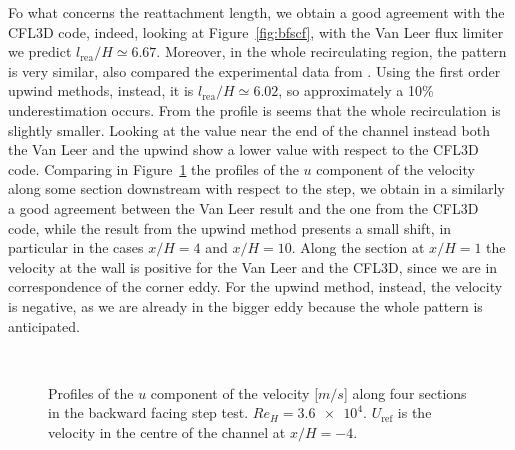 Fo what concerns the reattachment length, we obtain a good agreement with the CFL3D code, indeed, looking at Figure~\ref{fig:bfscf}, with the Van Leer flux limiter we predict $l_\text{rea} /H \simeq 6.67$. Moreover, in the whole recirculating region, the pattern is very similar, also compared the experimental data from \cite{bfs:driver}. Using the first order upwind methods, instead, it is $l_\text{rea} /H \simeq 6.02$, so approximately a 10\% underestimation occurs. From the profile is seems that the whole recirculation is slightly smaller. Looking at the value near the end of the channel instead both the Van Leer and the upwind show a lower value with respect to the CFL3D code. Comparing in Figure~\ref{fig:bfscomp} the profiles of the $u$ component of the velocity along some section downstream with respect to the step, we obtain in a similarly a good agreement between the Van Leer result and the one from the CFL3D code, while the result from the upwind method presents a small shift, in particular in the cases $x/H=4$ and $x/H=10$. Along the section at $x/H=1$ the velocity at the wall is positive for the Van Leer and the CFL3D, since we are in correspondence of the corner eddy. For the upwind method, instead, the velocity is negative, as we are already in the bigger eddy because the whole pattern is anticipated.
\begin{figure}[ht]
	\centering
	\subfloat[$x/H=-4$]{}
	\subfloat[$x/H=1$]{}\\
	\subfloat[$x/H=4$]{}
	\subfloat[$x/H=10$]{}
	\caption[Velocity profiles in the backward facing step test]{Profiles of the $u$ component of the velocity [$\si{m/s}$] along four sections in the backward facing step test. $Re_H=\num{3.6e4}$. $U_\text{ref}$ is the velocity in the centre of the channel at $x/H=-4$.}
	\label{fig:bfscomp}
\end{figure}
